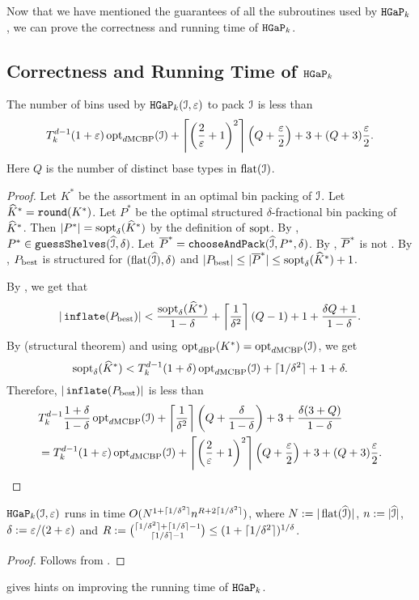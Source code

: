Now that we have mentioned the guarantees of all the subroutines used by $\operatorname{\mathtt{HGaP}}_{k}$,
we can prove the correctness and running time of $\operatorname{\mathtt{HGaP}}_{k}$.

\subsection{Correctness and Running Time of \texorpdfstring{$\operatorname{\mathtt{HGaP}}_{k}$}{HGaP}}

\begin{theorem}
\label{thm:hgap:hgap}
The number of bins used by $\operatorname{\mathtt{HGaP}}_{k}(\mathcal{I}, \varepsilon)$ to pack $\mathcal{I}$ is less than
\[ T_k^{d-1}(1+\varepsilon)\operatorname{opt}_{d\mathrm{MCBP}}(\mathcal{I})
    + \left\lceil \left(\frac{2}{\varepsilon}+1\right)^2 \right\rceil\left(Q + \frac{\varepsilon}{2}\right)
    + 3 + (Q+3)\frac{\varepsilon}{2}. \]
Here $Q$ is the number of distinct base types in $\operatorname{flat}(\mathcal{I})$.
\end{theorem}
\begin{proof}
Let $K^*$ be the assortment in an optimal bin packing of $\mathcal{I}$.
Let $\widehat{K}^* = \operatorname{\mathtt{round}}(K^*)$.
Let $P^*$ be the optimal structured $\delta$-fractional bin packing of $\widehat{K}^*$.
Then $|P^*| = \operatorname{sopt}_{\delta}(\widehat{K}^*)$ by the definition of $\operatorname{sopt}$.
By , $P^* \in \operatorname{\mathtt{guessShelves}}(\widehat{\mathcal{I}}, \delta)$.
Let $\overline{P}^* = \operatorname{\mathtt{chooseAndPack}}(\widehat{\mathcal{I}}, P^*, \delta)$.
By , $\overline{P}^*$ is not \Null{}.
By , $P_{\mathrm{best}}$ is
structured for $(\operatorname{flat}(\widehat{\mathcal{I}}), \delta)$
and $|P_{\mathrm{best}}| \le |\overline{P}^*| \le \operatorname{sopt}_{\delta}(\widehat{K}^*) + 1$.

By , we get that
\[ |\operatorname{\mathtt{inflate}}(P_{\mathrm{best}})| < \frac{\operatorname{sopt}_{\delta}(\widehat{K}^*)}{1-\delta}
    + \left\lceil \frac{1}{\delta^2} \right\rceil(Q-1) + 1 + \frac{\delta Q + 1}{1-\delta}. \]
By  (structural theorem)
and using $\operatorname{opt}_{d\mathrm{BP}}(K^*) = \operatorname{opt}_{d\mathrm{MCBP}}(\mathcal{I})$, we get
\[ \operatorname{sopt}_{\delta}(\widehat{K}^*) < T_k^{d-1}(1+\delta)\operatorname{opt}_{d\mathrm{MCBP}}(\mathcal{I}) + \lceil 1/\delta^2 \rceil + 1 + \delta. \]
Therefore, $|\operatorname{\mathtt{inflate}}(P_{\mathrm{best}})|$ is less than
\begin{align*}
&T_k^{d-1}\frac{1+\delta}{1-\delta}\operatorname{opt}_{d\mathrm{MCBP}}(\mathcal{I})
    + \left\lceil \frac{1}{\delta^2} \right\rceil\left(Q + \frac{\delta}{1-\delta}\right)
    + 3 + \frac{\delta(3+Q)}{1-\delta}
\\ &= T_k^{d-1}(1+\varepsilon)\operatorname{opt}_{d\mathrm{MCBP}}(\mathcal{I})
    + \left\lceil \left(\frac{2}{\varepsilon}+1\right)^2 \right\rceil\left(Q + \frac{\varepsilon}{2}\right)
    + 3 + (Q+3)\frac{\varepsilon}{2}.
\qedhere \end{align*}
\end{proof}
\begin{theorem}
\label{thm:hgap:hgap-time}
$\operatorname{\mathtt{HGaP}}_{k}(\mathcal{I}, \varepsilon)$ runs in time $O(N^{1+\lceil 1/\delta^2 \rceil}n^{R+2\lceil 1/\delta^2 \rceil})$, where
$N := |\operatorname{flat}(\widehat{\mathcal{I}})|$, $n := |\widehat{\mathcal{I}}|$, $\delta := \varepsilon/(2+\varepsilon)$
and $R := \binom{\lceil 1/\delta^2 \rceil + \left\lceil 1/\delta \right\rceil-1}{\left\lceil 1/\delta \right\rceil-1}
\le (1+\lceil 1/\delta^2 \rceil)^{1/\delta}$.
\end{theorem}
\begin{proof}
Follows from .
\end{proof}
 gives hints on improving the running time of $\operatorname{\mathtt{HGaP}}_{k}$.
